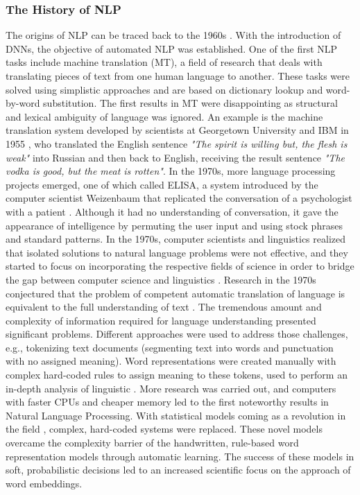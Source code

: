 \subsubsection{The History of NLP}
\label{sec:the_history_of_NLP}
The origins of NLP can be traced back to the 1960s \cite{dostert1955georgetown, Hutchins2006TheFP}. With the introduction of DNNs, the objective of automated NLP was established. One of the first NLP tasks include machine translation (MT), a field of research that deals with translating pieces of text from one human language to another. These tasks were solved using simplistic approaches and are based on dictionary lookup and word-by-word substitution. 
The first results in MT were disappointing as structural and lexical ambiguity of language was ignored. An example is the machine translation system developed by scientists at Georgetown University and IBM in 1955 \cite{dostert1955georgetown}, who translated the English sentence \textit{"The spirit is willing but, the flesh is weak"} into Russian and then back to English, receiving the result sentence \textit{"The vodka is good, but the meat is rotten"}.
 In the 1970s, more language processing projects emerged, one of which called ELISA, a system introduced by the computer scientist Weizenbaum that replicated the conversation of a psychologist with a patient \cite{weizenbaum1966eliza}. Although it had no understanding of conversation, it gave the appearance of intelligence by permuting the user input and using stock phrases and standard patterns. In the 1970s, computer scientists and linguistics realized that isolated solutions to natural language problems were not effective, and they started to focus on incorporating the respective fields of science in order to bridge the gap between computer science and linguistics \cite{kumar2011natural}. 
 Research in the 1970s conjectured that the problem of competent automatic translation of language is equivalent to the full understanding of text \cite{carbonell1981steps}. The tremendous amount and complexity of information required for language understanding presented significant problems. Different approaches were used to address those challenges, e.g., tokenizing text documents (segmenting text into words and punctuation with no assigned meaning). Word representations were created manually with complex hard-coded rules to assign meaning to these tokens, used to perform an in-depth analysis of linguistic \cite{catania1972chomsky}. 
 More research was carried out, and computers with faster CPUs and cheaper memory led to the first noteworthy results in Natural Language Processing. With statistical models coming as a revolution in the field \cite{bahl1989tree}, complex, hard-coded systems were replaced. 
 These novel models overcame the complexity barrier of the handwritten, rule-based word representation models through automatic learning. The success of these models in soft, probabilistic decisions led to an increased scientific focus on the approach of word embeddings.
 
